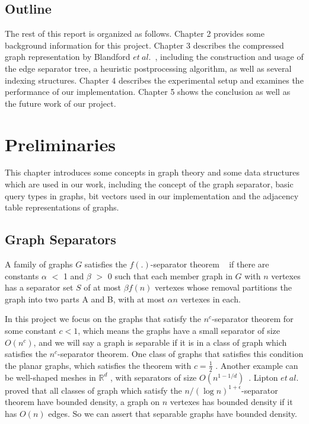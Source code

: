 \documentclass[12pt,glossary]{dalthesis}
\begin{document}
\section{Outline}
The rest of this report is organized as follows. Chapter 2 provides some background information for this project. Chapter 3 describes the compressed graph representation by Blandford $et \ al.$~\cite{compact-representation}, including the construction and usage of the edge separator tree, a heuristic postprocessing algorithm, as well as several indexing structures. Chapter 4 describes the experimental setup and examines the performance of our implementation. Chapter 5 shows the conclusion as well as the future work of our project.


\chapter{Preliminaries}

This chapter introduces some concepts in graph theory and some data structures which are used in our work, including the concept of the graph separator, basic query types in graphs, bit vectors used in our implementation and the adjacency table representations of graphs.

\section{Graph Separators}
A family of graphs $G$ satisfies the $f(.)$-separator theorem ~\cite{separator-theorem} if there are constants $\alpha$ $<$ 1 and $\beta$ $>$ 0 such that each member graph in $G$ with $n$ vertexes has a separator set $S$ of at most $\beta f(n)$ vertexes whose removal partitions the graph into two parts A and B, with at most $\alpha n$ vertexes in each.

\bigskip
\bigskip

In this project we focus on the graphs that satisfy the $n^{c}$-separator theorem for some constant $c < 1$, which means the graphs have a small separator of size $O(n^{c})$, and we will say a graph is separable if it is in a class of graph which satisfies the $n^{c}$-separator theorem. One class of graphs that satisfies this condition the planar graphs, which satisfies the theorem with $c = \frac{1}{2}$ . Another example can be well-shaped meshes in $\mathbb{R}^{d}$ , with separators of size $O(n^{1-1/d})$~\cite{ separators-sphere-packing}.  Lipton $et \ al$.~\cite{Nested-Dissection} proved that all classes of graph which satisfy the $n/(\log n )^{1+\epsilon}$-separator theorem have bounded density, a graph on $n$ vertexes has bounded density if it has $O(n)$ edges. So we can assert that separable graphs have bounded density.
\end{document}
